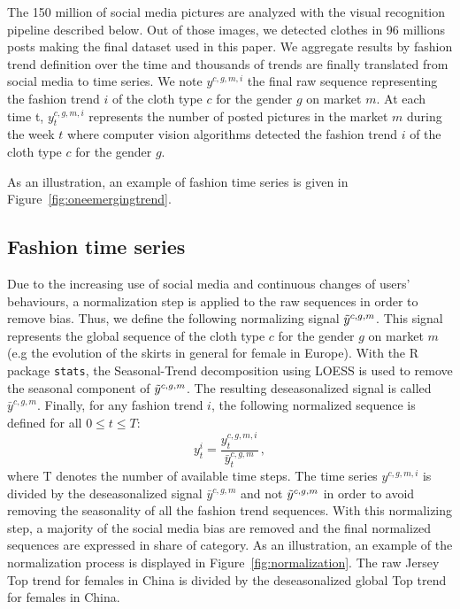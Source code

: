 \documentclass[review]{elsarticle}
\begin{document}
The 150 million of social media pictures are analyzed with the visual recognition pipeline described below. Out of those images, we detected clothes in 96 millions posts making the final dataset used in this paper. We aggregate results by fashion trend definition over the time and  thousands of trends are finally translated from social media to time series. We note $y^{c,g,m,i}$ the final raw sequence representing the fashion trend $i$ of the cloth type $c$ for the gender $g$ on market $m$. At each time t, $y^{c,g,m,i}_t$ represents the number of posted pictures in the market $m$ during the week $t$ where computer vision algorithms detected the fashion trend $i$ of the cloth type $c$ for the gender $g$.

As an illustration, an example of fashion time series is given in Figure~\ref{fig:oneemergingtrend}.




\subsection{Fashion time series}
\label{sec:dataset:b}

Due to the increasing use of social media and continuous changes of users' behaviours, a normalization step is applied to the raw sequences in order to remove bias. Thus, we define the following normalizing signal $\Tilde{y}^{c,g,m}$. This signal represents the global sequence of the cloth type $c$ for the gender $g$ on market $m$ (e.g the evolution of the skirts in general for female in Europe). With the R package \texttt{stats}, the Seasonal-Trend decomposition using LOESS  \cite{cleveland1990} is used to remove the seasonal component of $\Tilde{y}^{c,g,m}$. The resulting deseasonalized signal is called  $\bar{y}^{c,g,m}$. Finally, for any fashion trend $i$, the following normalized sequence is defined for all $ 0 \leq t \leq T$:
\begin{equation}
    y^{i}_t = \frac{y^{c,g,m,i}_{t}}{\bar{y}^{c,g,m}_t}\,,
\end{equation}
where T denotes the number of available time steps. The time series $y^{c,g,m,i}$ is divided by the deseasonalized signal $\bar{y}^{c,g,m}$ and not $\Tilde{y}^{c,g,m}$ in order to avoid removing the seasonality of all the fashion trend sequences. With this normalizing step, a majority of the social media bias are removed and the final normalized sequences are expressed in share of category. As an illustration, an example of the normalization process is displayed in Figure~\ref{fig:normalization}. The raw Jersey Top trend for females in China is divided by the deseasonalized global Top trend for females in China. 
\end{document}
